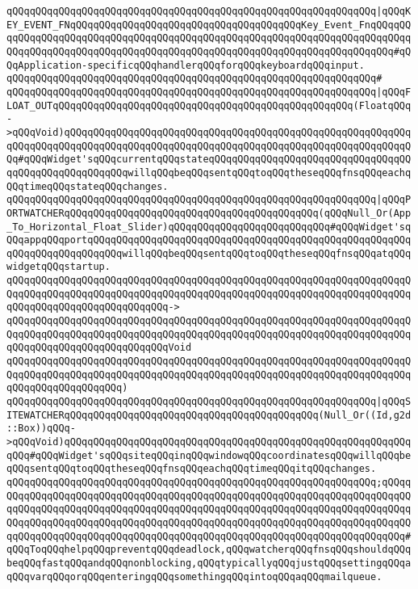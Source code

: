 \verb|qQQqqQQqqQQqqQQqqQQqqQQqqQQqqQQqqQQqqQQqqQQqqQQqqQQqqQQqqQQqqQQq|\verb#|qQQqKEY_EVENT_FNqQQqqQQqqQQqqQQqqQQqqQQqqQQqqQQqqQQqqQQqKey_Event_FnqQQqqQQqqQQqqQQqqQQqqQQqqQQqqQQqqQQqqQQqqQQqqQQqqQQqqQQqqQQqqQQqqQQqqQQqqQQqqQQqqQQqqQQqqQQqqQQqqQQqqQQqqQQqqQQqqQQqqQQqqQQqqQQqqQQqqQQqqQQqqQQq#\verb|#qQQqApplication-specificqQQqhandlerqQQqforqQQqkeyboardqQQqinput.|\newline
\verb|qQQqqQQqqQQqqQQqqQQqqQQqqQQqqQQqqQQqqQQqqQQqqQQqqQQqqQQqqQQqqQQq#|\newline
\verb|qQQqqQQqqQQqqQQqqQQqqQQqqQQqqQQqqQQqqQQqqQQqqQQqqQQqqQQqqQQqqQQq|\verb#|qQQqFLOAT_OUTqQQqqQQqqQQqqQQqqQQqqQQqqQQqqQQqqQQqqQQqqQQqqQQqqQQq(FloatqQQq->qQQqVoid)qQQqqQQqqQQqqQQqqQQqqQQqqQQqqQQqqQQqqQQqqQQqqQQqqQQqqQQqqQQqqQQqqQQqqQQqqQQqqQQqqQQqqQQqqQQqqQQqqQQqqQQqqQQqqQQqqQQqqQQqqQQqqQQqqQQq#\verb|#qQQqWidget'sqQQqcurrentqQQqstateqQQqqQQqqQQqqQQqqQQqqQQqqQQqqQQqqQQqqQQqqQQqqQQqqQQqqQQqwillqQQqbeqQQqsentqQQqtoqQQqtheseqQQqfnsqQQqeachqQQqtimeqQQqstateqQQqchanges.|\newline
\verb|qQQqqQQqqQQqqQQqqQQqqQQqqQQqqQQqqQQqqQQqqQQqqQQqqQQqqQQqqQQqqQQq|\verb#|qQQqPORTWATCHERqQQqqQQqqQQqqQQqqQQqqQQqqQQqqQQqqQQqqQQqqQQq(qQQqNull_Or(App_To_Horizontal_Float_Slider)qQQqqQQqqQQqqQQqqQQqqQQqqQQq#\verb|#qQQqWidget'sqQQqappqQQqportqQQqqQQqqQQqqQQqqQQqqQQqqQQqqQQqqQQqqQQqqQQqqQQqqQQqqQQqqQQqqQQqqQQqqQQqqQQqwillqQQqbeqQQqsentqQQqtoqQQqtheseqQQqfnsqQQqatqQQqwidgetqQQqstartup.|\newline
\verb|qQQqqQQqqQQqqQQqqQQqqQQqqQQqqQQqqQQqqQQqqQQqqQQqqQQqqQQqqQQqqQQqqQQqqQQqqQQqqQQqqQQqqQQqqQQqqQQqqQQqqQQqqQQqqQQqqQQqqQQqqQQqqQQqqQQqqQQqqQQqqQQqqQQqqQQqqQQqqQQqqQQqqQQq->|\newline
\verb|qQQqqQQqqQQqqQQqqQQqqQQqqQQqqQQqqQQqqQQqqQQqqQQqqQQqqQQqqQQqqQQqqQQqqQQqqQQqqQQqqQQqqQQqqQQqqQQqqQQqqQQqqQQqqQQqqQQqqQQqqQQqqQQqqQQqqQQqqQQqqQQqqQQqqQQqqQQqqQQqqQQqqQQqVoid|\newline
\verb|qQQqqQQqqQQqqQQqqQQqqQQqqQQqqQQqqQQqqQQqqQQqqQQqqQQqqQQqqQQqqQQqqQQqqQQqqQQqqQQqqQQqqQQqqQQqqQQqqQQqqQQqqQQqqQQqqQQqqQQqqQQqqQQqqQQqqQQqqQQqqQQqqQQqqQQqqQQqqQQq)|\newline
\verb|qQQqqQQqqQQqqQQqqQQqqQQqqQQqqQQqqQQqqQQqqQQqqQQqqQQqqQQqqQQqqQQq|\verb#|qQQqSITEWATCHERqQQqqQQqqQQqqQQqqQQqqQQqqQQqqQQqqQQqqQQqqQQq(Null_Or((Id,g2d::Box))qQQq->qQQqVoid)qQQqqQQqqQQqqQQqqQQqqQQqqQQqqQQqqQQqqQQqqQQqqQQqqQQqqQQqqQQqqQQq#\verb|#qQQqWidget'sqQQqsiteqQQqinqQQqwindowqQQqcoordinatesqQQqwillqQQqbeqQQqsentqQQqtoqQQqtheseqQQqfnsqQQqeachqQQqtimeqQQqitqQQqchanges.|\newline
\verb|qQQqqQQqqQQqqQQqqQQqqQQqqQQqqQQqqQQqqQQqqQQqqQQqqQQqqQQqqQQqqQQq;qQQqqQQqqQQqqQQqqQQqqQQqqQQqqQQqqQQqqQQqqQQqqQQqqQQqqQQqqQQqqQQqqQQqqQQqqQQqqQQqqQQqqQQqqQQqqQQqqQQqqQQqqQQqqQQqqQQqqQQqqQQqqQQqqQQqqQQqqQQqqQQqqQQqqQQqqQQqqQQqqQQqqQQqqQQqqQQqqQQqqQQqqQQqqQQqqQQqqQQqqQQqqQQqqQQqqQQqqQQqqQQqqQQqqQQqqQQqqQQqqQQqqQQqqQQqqQQqqQQqqQQqqQQqqQQqqQQqqQQqqQQq#qQQqToqQQqhelpqQQqpreventqQQqdeadlock,qQQqwatcherqQQqfnsqQQqshouldqQQqbeqQQqfastqQQqandqQQqnonblocking,qQQqtypicallyqQQqjustqQQqsettingqQQqaqQQqvarqQQqorqQQqenteringqQQqsomethingqQQqintoqQQqaqQQqmailqueue.|\newline
